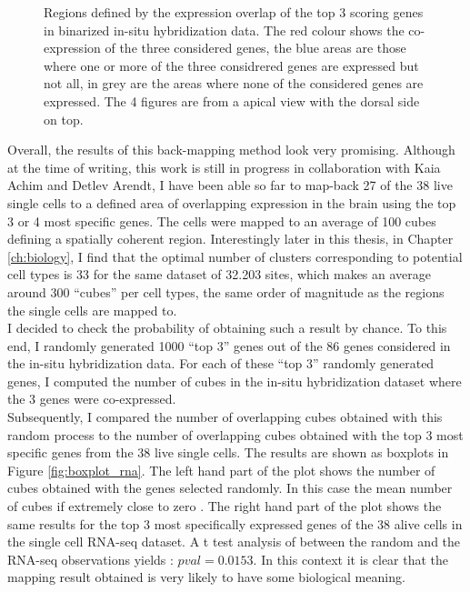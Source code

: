 \begin{figure}[H]
        \caption{Regions defined by the expression overlap of the top 3 scoring genes in \cite{Tomer10} binarized in-situ hybridization data. The red colour shows the co-expression of the three considered genes, the blue areas are those where one or more of the three considrered genes are expressed but not all, in grey are the areas where none of the considered genes are expressed. The 4 figures are from a apical view with the dorsal side on top.}\label{fig:cell_localization}
\end{figure}

Overall, the results of this back-mapping method look very promising. Although at the time of writing, this work is still in progress in collaboration with Kaia Achim and Detlev Arendt, I have been able so far to map-back 27 of the 38 live single cells to a defined area of overlapping expression in the brain using the top 3 or 4 most specific genes. The cells were mapped to an average of 100 cubes defining a spatially coherent region. Interestingly later in this thesis, in Chapter \ref{ch:biology}, I find that the optimal number of clusters corresponding to potential cell types is 33 for the same dataset of 32.203 sites, which makes an average around 300 ``cubes'' per cell types, the same order of magnitude as the regions the single cells are mapped to.  \\

I decided to check the probability of obtaining such a result by chance. To this end, I randomly generated 1000 ``top 3'' genes out of the 86 genes considered in the in-situ hybridization data. For each of these ``top 3'' randomly generated genes, I computed the number of cubes in the in-situ hybridization dataset where the 3 genes were co-expressed.\\

Subsequently, I compared the number of overlapping cubes obtained with this random process to the number of overlapping cubes obtained with the top 3 most specific genes from the 38 live single cells. The results are shown as boxplots in Figure \ref{fig:boxplot_rna}. The left hand part of the plot shows the number of cubes obtained with the genes selected randomly. In this case the mean number of cubes if extremely close to zero . The right hand part of the plot shows the same results for the top 3 most specifically expressed genes of the 38 alive cells in the single cell RNA-seq dataset. A t test analysis of between the random and the RNA-seq observations yields : $pval = 0.0153$. In this context it is clear that the mapping result obtained is very likely to have some biological meaning.

